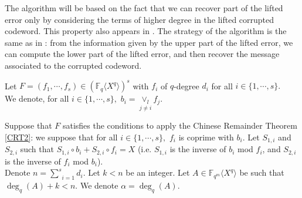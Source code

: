 \documentclass{article}
\theoremstyle{definition}
\begin{document}
The algorithm will be based on the fact that we can recover part of the lifted error only by considering the terms of higher degree in the lifted corrupted codeword. This property also appears in \cite{yu_polynomial_2012}. The strategy of the algorithm is the same as in \cite{yu_polynomial_2012}: from the information given by the upper part of the lifted error, we can compute the lower part of the lifted error, and then recover the message associated to the corrupted codeword.
\color{black}

\noindent Let $F = (f_1, \cdots, f_s) \in (\mathbb{F}_q \langle X^q \rangle)^s$ with $f_i$
of $q$-degree $d_i$ for all $i \in \{ 1, \cdots, s \}.$ \\
We denote, for all $i \in \{ 1, \cdots, s\},$ $b_i = \underset{j \neq
            i}{\vee_l} f_j$.

\noindent Suppose that $F$ satisfies the conditions to apply the Chinese Remainder Theorem \ref{CRT2}: we suppose that for all $i \in \{ 1, \cdots, s\},$ $f_i$ is coprime with $b_i$. Let $S_{1, i}$ and $S_{2, i}$ such that $S_{1, i} \circ b_i +
      S_{2, i} \circ f_i = X$ (i.e. $S_{1, i}$ is the inverse of $b_i$ mod $f_i$, and   $S_{2, i}$ is the inverse of $f_i$ mod $b_i$).\\
Denote $n = \underset{i = 1}{\overset{s}{\sum}} d_i$. Let $k < n$ be an
integer. Let $A \in \mathbb{F}_{q^m}\langle X^q \rangle$ be such that $\deg_q(A)+k<n.$ We denote $\alpha = \deg_q(A)$. \\
\end{document}
